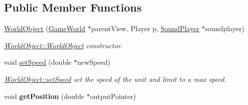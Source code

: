 \subsection*{Public Member Functions}
\begin{DoxyCompactItemize}
\item 
\hyperlink{class_world_object_a064fcf6f95ab0bcef4eaacaad35d1aee}{World\+Object} (\hyperlink{class_game_world}{Game\+World} $\ast$parent\+View, Player p, \hyperlink{class_sound_player}{Sound\+Player} $\ast$soundplayer)
\begin{DoxyCompactList}\small\item\em \hyperlink{class_world_object_a064fcf6f95ab0bcef4eaacaad35d1aee}{World\+Object\+::\+World\+Object} constructor. \end{DoxyCompactList}\item 
void \hyperlink{class_world_object_a0a4c93b5c06696aa664aae256d5378d9}{set\+Speed} (double $\ast$new\+Speed)
\begin{DoxyCompactList}\small\item\em \hyperlink{class_world_object_a0a4c93b5c06696aa664aae256d5378d9}{World\+Object\+::set\+Speed} set the speed of the unit and limit to a max speed. \end{DoxyCompactList}\item 
void {\bfseries get\+Position} (double $\ast$output\+Pointer)\hypertarget{class_world_object_a5e4d104947f9068c4d84669aad29c792}{}\label{class_world_object_a5e4d104947f9068c4d84669aad29c792}


\end{DoxyCompactItemize}
